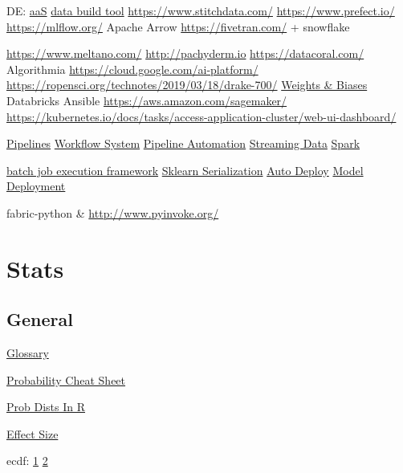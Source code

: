 \documentclass[]{book}
\begin{document}
DE: \href{https://www.astronomer.io/}{aaS} \href{https://www.getdbt.com/}{data build tool} \url{https://www.stitchdata.com/} \url{https://www.prefect.io/} \url{https://mlflow.org/} Apache Arrow \url{https://fivetran.com/} + snowflake

\url{https://www.meltano.com/} \url{http://pachyderm.io} \url{https://datacoral.com/} Algorithmia \url{https://cloud.google.com/ai-platform/} \url{https://ropensci.org/technotes/2019/03/18/drake-700/} \href{https://www.wandb.com/blog/towards-reproducibility}{Weights \& Biases} Databricks Ansible \url{https://aws.amazon.com/sagemaker/} \url{https://kubernetes.io/docs/tasks/access-application-cluster/web-ui-dashboard/}

\href{http://stat545.com/automation01_slides/\#/automating-data-analysis-pipelines}{Pipelines} \href{https://snakemake.readthedocs.io/en/stable/}{Workflow System} \href{http://stat545.com/automation01_slides/\#/automating-data-analysis-pipelines}{Pipeline Automation} \href{https://www.wallaroolabs.com}{Streaming Data} \href{https://docs.azuredatabricks.net/spark/latest/mllib/mllib-pipelines-and-stuctured-streaming.html}{Spark}

\href{https://stitchfix.github.io/flotilla-os/}{batch job execution framework} \href{https://cmry.github.io/notes/serialize}{Sklearn Serialization} \href{http://content.nexosis.com/twimlai}{Auto Deploy} \href{https://orchestrahq.com}{Model Deployment}

fabric-python \& \url{http://www.pyinvoke.org/}

\hypertarget{stats}{%
\chapter{Stats}\label{stats}}

\hypertarget{general-3}{%
\section{General}\label{general-3}}

\href{http://hbiostat.org/doc/glossary.pdf}{Glossary}

\href{http://www.wzchen.com/probability-cheatsheet}{Probability Cheat Sheet}

\href{http://www.cyclismo.org/tutorial/R/probability.html}{Prob Dists In R}

\href{https://www.leeds.ac.uk/educol/documents/00002182.htm}{Effect Size}

ecdf: \href{http://www.ericmjl.com/blog/2018/7/14/ecdfs/}{1} \href{https://www.rdocumentation.org/packages/stats/versions/3.4.3/topics/ecdf}{2}
\end{document}
